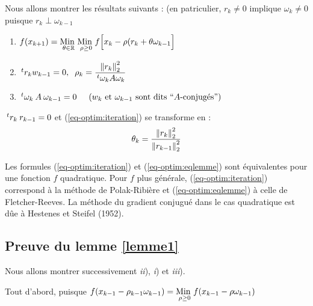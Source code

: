 Nous allons montrer les résultats suivants : (en patriculier, $r_k \neq 0$ implique
$\omega_k \neq 0$ puisque $r_k \perp \omega_{k-1}$


\begin{lemme}
    \begin{enumerate}[label=\textit{\roman*)}]
        \item $f(x_{k+1}) = \underset{\theta \in \mathbb{R}}{\text{Min }} \underset{\rho \geq 0}{\text{Min }} f \Big[ x_k - \rho(r_k + \theta \omega_{k-1} \Big]$

        \item $\,^tr_k w_{k-1} = 0, 
            \hspace{0.2cm} 
            \rho_k = \dfrac{\left\lVert r_k\right\rVert^2_2}{\,^t\omega_k A \omega_k}$

        \item $\,^t\omega_k \: A \: \omega_{k-1} = 0 \hspace{0.5cm} (w_k \text{ et }
            \omega_{k-1} \text{ sont dits ``$A$-conjugés''})$
    \end{enumerate} 

    \label{lemme1}
\end{lemme}

\begin{lemme}
    $\,^tr_k \: r_{k-1} = 0$ et (\ref{eq-optim:iteration}) se transforme en :
    \begin{align}
        \theta_k = \frac{\left\lVert r_k\right\rVert_2^2}{\left\lVert r_{k-1}\right\rVert_2^2}
        \label{eq-optim:eqlemme}
    \end{align}
    \label{lemme2}
\end{lemme}

\begin{remark}
    Les formules (\ref{eq-optim:iteration}) et (\ref{eq-optim:eqlemme}) sont équivalentes pour
    une fonction $f$ quadratique. Pour $f$ plus générale, (\ref{eq-optim:iteration}) correspond
    à la méthode de Polak-Ribière et (\ref{eq-optim:eqlemme}) à celle de Fletcher-Reeves.
    La méthode du gradient conjugué dans le cas quadratique est dûe à Hestenes et
    Steifel (1952).
\end{remark}

\subsection{Preuve du lemme \ref{lemme1}}
Nous allons montrer successivement \textit{ii}), \textit{i}) et \textit{iii}).

Tout d'abord, puisque $f(x_{k-1} - \rho_{k-1} \omega_{k-1}) = \underset{\rho \geq 0}{\text{Min }} f(x_{k-1} - \rho \omega_{k-1})$

